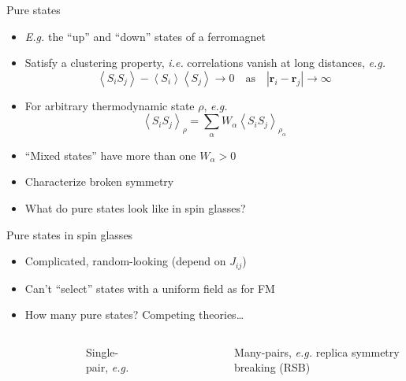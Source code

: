 \documentclass{beamer}
\newcommand{\abs}[1]{\left|#1\right|}
\newcommand{\av}[1]{\left<#1\right>}
\newcommand{\qea}{q_{\text{EA}}}
\renewcommand{\vec}[1]{\bm{#1}}
\begin{document}
\begin{frame}{Pure states}
  \begin{itemize}
    \item \textit{E.g.} the ``up'' and ``down'' states of a ferromagnet
    \item Satisfy a \alert{clustering property}, \textit{i.e.} correlations
      vanish at long distances,
      \textit{e.g.}
      \begin{equation*}
        \av{S_i S_j} - \av{S_i}\av{S_j} \to 0
        \quad\text{as}\quad
        \abs{\vec{r}_i-\vec{r}_j}\to\infty
      \end{equation*}
    \item For arbitrary thermodynamic state $\rho$, \textit{e.g.}
      \begin{equation*}
        \av{S_i S_j}_{\rho} = \sum_{\alpha} W_{\alpha} \av{S_i S_j}_{\rho_{\alpha}}
      \end{equation*}
    \item ``Mixed states'' have more than one $W_{\alpha} > 0$
    \item Characterize broken symmetry
    \item \alert{What do pure states look like in spin glasses?}
  \end{itemize}
\end{frame}

\begin{frame}{Pure states in spin glasses}
  \begin{itemize}
    \item Complicated, random-looking (depend on $J_{ij}$)
    \item Can't ``select'' states with a uniform field as for FM
    \item \alert{How many pure states?} Competing theories\dots
  \end{itemize}
  \begin{columns}[t]
    \centering
    \begin{figure}
      \centering
    \end{figure}
    Single-pair, \textit{e.g.} 
    \centering
    \begin{figure}
      \centering
      
    \end{figure}
    Many-pairs, \textit{e.g.} replica symmetry breaking \alert{(RSB)}
  \end{columns}
\end{frame}
\end{document}
